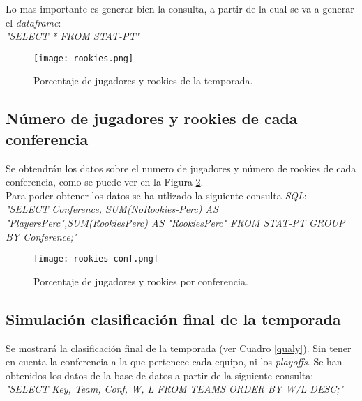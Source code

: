 \documentclass[11pt]{diazessay} %
\begin{document}
Lo mas importante es generar bien la consulta, a partir de la cual se va a generar el \textit{dataframe}:\\

\textit{"SELECT * FROM STAT-PT"}

\begin{figure}[!h]
	\centering
	\texttt{[image: rookies.png]}
	\caption{Porcentaje de jugadores y rookies de la temporada.}
	\label{fig:rookies}
\end{figure}


\subsection*{Número de jugadores y rookies de cada conferencia}
Se obtendrán los datos sobre el numero de jugadores y número de rookies de cada conferencia, como se puede ver en la Figura \ref{fig:rookies-conf}. \\

Para poder obtener los datos se ha utlizado la siguiente consulta \textit{SQL}:\\

\textit{"SELECT Conference, SUM(NoRookies-Perc) AS "PlayersPerc",SUM(RookiesPerc) AS "RookiesPerc" FROM STAT-PT GROUP BY Conference;"}

\begin{figure}[!h]
	\centering
	\texttt{[image: rookies-conf.png]}
	\caption{Porcentaje de jugadores y rookies por conferencia.}
	\label{fig:rookies-conf}
\end{figure}

\subsection*{Simulación clasificación final de la temporada}
Se mostrará la clasificación final de la temporada (ver Cuadro \ref{qualy}). Sin tener en cuenta la conferencia a la que pertenece cada equipo, ni los \textit{playoffs}. 
Se han obtenidos los datos de la base de datos a partir de la siguiente consulta:\\

\textit{"SELECT Key, Team, Conf, W, L FROM TEAMS ORDER BY W/L DESC;"}
\end{document}
